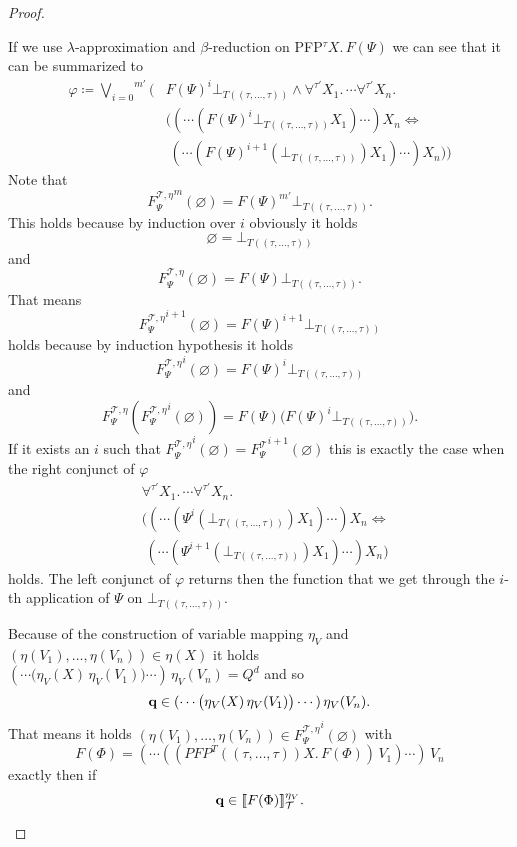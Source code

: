 \begin{proof}
\begin{compactitem}
         If we use $\lambda$-approximation and $\beta$-reduction on PFP$^\tau X.\,F(\Psi)$ we can 
         see that it can be summarized to
         \begin{align*}
         \varphi \coloneqq \overset{m'}{\underset{i= 0}{\bigvee}} \Big(&F(\Psi)^i \bot_{T((\tau, \dots, \tau))} \wedge \forall^{\tau'} X_1.\, \dotsb \forall^{\tau'} X_n.\,\\& 
         \big((\dotsb(F(\Psi)^i \bot_{T((\tau, \dots, \tau))} X_1)\dotsb)X_n \Leftrightarrow \\&\;(\dotsb(F(\Psi)^{i+1}(\bot_{T((\tau, \dots, \tau))}) X_1)\dotsb)X_n\big)\Big)
         \end{align*}
		Note that 
		\[{F_\Psi^{\mathcal{T},\eta}}^m(\varnothing) = F(\Psi)^{m'} \bot_{T((\tau, \dots, \tau))}.\] 
		This holds because by induction over $i$ obviously it holds
		\[\varnothing = \bot_{T((\tau, \dots, \tau))}\] 
		and 
		\[F_\Psi^{\mathcal{T},\eta}(\varnothing) = F(\Psi)\bot_{T((\tau, \dots, \tau))}.\] 
		That means 
		\[{F_\Psi^{\mathcal{T},\eta}}^{i+1}(\varnothing) = F(\Psi)^{i+1}\bot_{T((\tau, \dots, \tau))}\] 
		holds because by induction hypothesis it holds 
		\[{F_\Psi^{\mathcal{T},\eta}}^{i}
		(\varnothing) = F(\Psi)^{i}\bot_{T((\tau, \dots, \tau))}\] 
		and 
		\[F_\Psi^{\mathcal{T},\eta}({F_\Psi^{\mathcal{T},\eta}}^{i}(\varnothing))= F(\Psi)\big(F(\Psi)^{i}\bot_{T((\tau, \dots, \tau))})\big.\]
		If it exists an $i$ such that ${F_\Psi^{\mathcal{T},\eta}}^i(\varnothing) = {F_\Psi^		
        \mathcal{T}}^{i+1}(\varnothing)$ this is exactly the case when the right conjunct of $\varphi$
		\begin{align*}
		&\forall^{\tau'} X_1.\, \dotsb \forall^{\tau'} X_n.\,\\& 
         \big((\dotsb(\Psi^i(\bot_{T((\tau, \dots, \tau))}) X_1)\dotsb)X_n \Leftrightarrow \\&\;(\dotsb(\Psi^{i+1}(\bot_{T((\tau, \dots, \tau))}) X_1)\dotsb)X_n\big)
         \end{align*}
		holds. The left conjunct of $\varphi$ returns then the function that we get through  
		the $i$-th application of $\Psi$ on $\bot_{T((\tau, \dots, \tau))}$.
		
		Because of the construction of variable mapping $\eta_V$ and $(\eta(V_1), \dots, \eta(V_n)) 
		\in \eta(X)$ it holds $(\dotsb\big(\eta_V(X)\,\eta_V(V_1)\big) \dotsb )\,\eta_V(V_n) = Q^d$
        and so 
         \[\emph{q} \in (\dotsb\big(\eta_V(X)\,\eta_V(V_1)\big) \dotsb )\,\eta_V(V_n).\]
         That means it holds $(\eta(V_1), \dots, \eta(V_n)) \in {F_\Psi^{\mathcal{T},\eta}}^i(\varnothing)$ with 
        \[F(\Phi) = (\dotsb((PFP^T((\tau, \dots, \tau)) X.\, F(\Phi))\, V_1)\dotsb )\, V_n \]
        exactly then if \[\emph{q} \in \llbracket F(\Phi) \rrbracket_\mathcal{T}^{\eta_V}.\]
        

\end{compactitem}
\end{proof}
